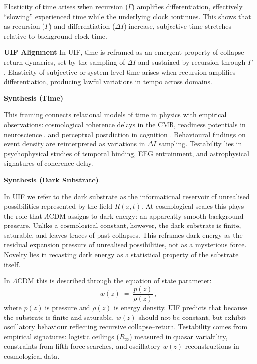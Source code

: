 Elasticity of time arises when recursion ($\Gamma$) amplifies differentiation, effectively “slowing” experienced time while the underlying clock continues. This shows that as recursion ($\Gamma$) and differentiation ($\Delta I$) increase, subjective time stretches relative to background clock time.
\newline

\noindent
\textbf{UIF Alignment} 
\newline
\noindent In UIF, time is reframed as an emergent property of collapse–return dynamics, set by the sampling of $\Delta I$ and sustained by recursion through $\Gamma$. Elasticity of subjective or system-level time arises when recursion amplifies differentiation, producing lawful variations in tempo across domains.
\newline

\noindent \textbf{Synthesis (Time)}

\noindent This framing connects relational models of time in physics 
\cite{PageWootters1983,Rovelli1995}
with empirical observations: cosmological coherence delays in the CMB, 
readiness potentials in neuroscience \cite{Libet1983}, 
and perceptual postdiction in cognition \cite{Eagleman2009}. 
Behavioural findings on event density \cite{Buhusi2005}
are reinterpreted as variations in $\Delta I$ sampling. 
Testability lies in psychophysical studies of temporal binding, EEG entrainment, 
and astrophysical signatures of coherence delay.
\newline

\noindent \textbf {Synthesis (Dark Substrate).}

\noindent In UIF we refer to the dark substrate as the informational reservoir of unrealised possibilities represented by the field $R(x,t)$. At cosmological scales this plays the role that $\Lambda$CDM assigns to dark energy: an apparently smooth background pressure. Unlike a cosmological constant, however, the dark substrate is finite, saturable, and leaves traces of past collapses. This reframes dark energy as the residual expansion pressure of unrealised possibilities, not as a mysterious force. Novelty lies in recasting dark energy as a statistical property of the substrate itself.

\noindent
In $\Lambda$CDM this is described through the equation of state parameter:
\begin{equation}
\label{eq:65}
w(z) \;=\; \frac{p(z)}{\rho(z)}\,,
\end{equation}
where $p(z)$ is pressure and $\rho(z)$ is energy density. UIF predicts that because the substrate is finite and saturable, $w(z)$ should not be constant, but exhibit oscillatory behaviour reflecting recursive collapse–return. Testability comes from empirical signatures: logistic ceilings ($R_\infty$) measured in quasar variability, constraints from fifth-force searches, and oscillatory $w(z)$ reconstructions in cosmological data.
\newline

